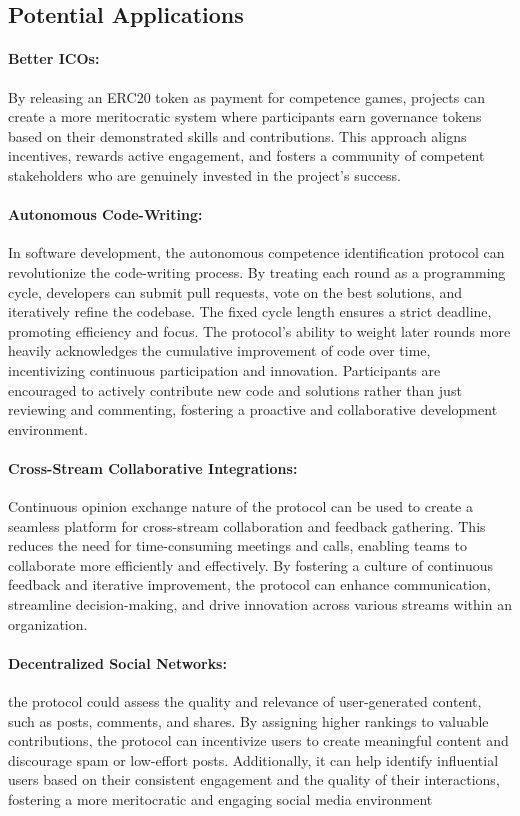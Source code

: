 \documentclass{article}
\begin{document}
\begin{CJK}{UTF8}{gbsn}
\begin{multicols}{2}
        \section{Potential Applications}
        \paragraph*{Better ICOs:} By releasing an ERC20 token as payment for competence games, projects can create a more meritocratic system where participants earn governance tokens based on their demonstrated skills and contributions. This approach aligns incentives, rewards active engagement, and fosters a community of competent stakeholders who are genuinely invested in the project's success.

        \paragraph*{Autonomous Code-Writing:} In software development, the autonomous competence identification protocol can revolutionize the code-writing process. By treating each round as a programming cycle, developers can submit pull requests, vote on the best solutions, and iteratively refine the codebase. The fixed cycle length ensures a strict deadline, promoting efficiency and focus. The protocol's ability to weight later rounds more heavily acknowledges the cumulative improvement of code over time, incentivizing continuous participation and innovation. Participants are encouraged to actively contribute new code and solutions rather than just reviewing and commenting, fostering a proactive and collaborative development environment.

        \paragraph*{Cross-Stream Collaborative Integrations:} Continuous opinion exchange nature of the protocol can be used to create a seamless platform for cross-stream collaboration and feedback gathering. This reduces the need for time-consuming meetings and calls, enabling teams to collaborate more efficiently and effectively. By fostering a culture of continuous feedback and iterative improvement, the protocol can enhance communication, streamline decision-making, and drive innovation across various streams within an organization.

        \paragraph*{Decentralized Social Networks:} the protocol could assess the quality and relevance of user-generated content, such as posts, comments, and shares. By assigning higher rankings to valuable contributions, the protocol can incentivize users to create meaningful content and discourage spam or low-effort posts. Additionally, it can help identify influential users based on their consistent engagement and the quality of their interactions, fostering a more meritocratic and engaging social media environment


\end{multicols}
\end{CJK}
\end{document}
